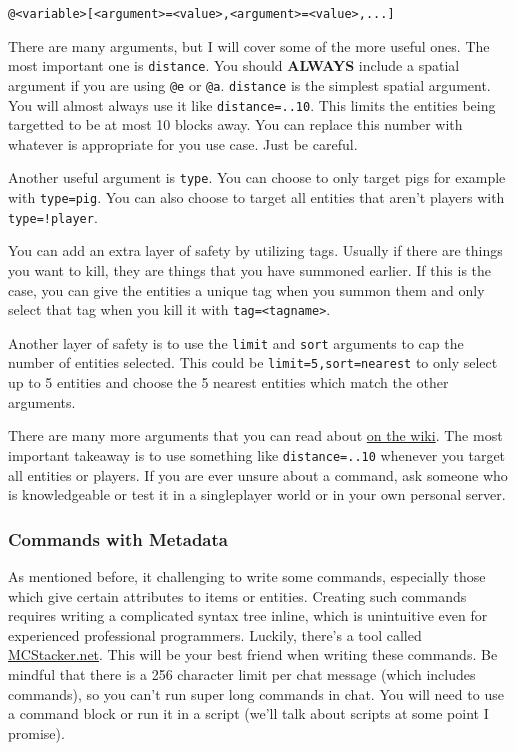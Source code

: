 \documentclass[oneside]{book}
\begin{document}
\begin{verbatim}
@<variable>[<argument>=<value>,<argument>=<value>,...]
\end{verbatim}

There are many arguments, but I will cover some of the more useful ones. The most important one is \texttt{distance}. You should \textbf{ALWAYS} include a spatial argument if you are using \texttt{@e} or \texttt{@a}. \texttt{distance} is the simplest spatial argument. You will almost always use it like \texttt{distance=..10}. This limits the entities being targetted to be at most 10 blocks away. You can replace this number with whatever is appropriate for you use case. Just be careful.

Another useful argument is \texttt{type}. You can choose to only target pigs for example with \texttt{type=pig}. You can also choose to target all entities that aren't players with \texttt{type=!player}.

You can add an extra layer of safety by utilizing tags. Usually if there are things you want to kill, they are things that you have summoned earlier. If this is the case, you can give the entities a unique tag when you summon them and only select that tag when you kill it with \texttt{tag=<tagname>}.

Another layer of safety is to use the \texttt{limit} and \texttt{sort} arguments to cap the number of entities selected. This could be \texttt{limit=5,sort=nearest} to only select up to 5 entities and choose the 5 nearest entities which match the other arguments.

There are many more arguments that you can read about \href{https://minecraft.wiki/w/Target_selectors}{on the wiki}. The most important takeaway is to use something like \texttt{distance=..10} whenever you target all entities or players. If you are ever unsure about a command, ask someone who is knowledgeable or test it in a singleplayer world or in your own personal server.

\subsubsection*{Commands with Metadata}
As mentioned before, it challenging to write some commands, especially those which give certain attributes to items or entities. Creating such commands requires writing a complicated syntax tree inline, which is unintuitive even for experienced professional programmers. Luckily, there's a tool called \href{https://mcstacker.net/}{MCStacker.net}. This will be your best friend when writing these commands. Be mindful that there is a 256 character limit per chat message (which includes commands), so you can't run super long commands in chat. You will need to use a command block or run it in a script (we'll talk about scripts at some point I promise).
\end{document}

